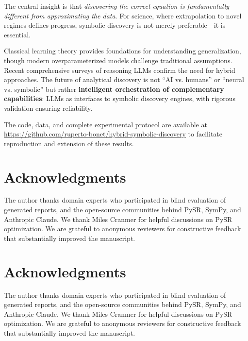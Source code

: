\documentclass[twoside,11pt]{article}
\begin{document}
The central insight is that \emph{discovering the correct equation is fundamentally different from approximating the data}. For science, where extrapolation to novel regimes defines progress, symbolic discovery is not merely preferable---it is essential\citep{koza1994genetic}.

Classical learning theory \citep{vapnik1999overview,bishop2006pattern,goodfellow2016deep} provides foundations for understanding generalization, though modern overparameterized models challenge traditional assumptions. Recent comprehensive surveys \citep{zhang2025survey} of reasoning LLMs confirm the need for hybrid approaches. The future of analytical discovery is not ``AI vs. humans'' or ``neural vs. symbolic'' but rather \textbf{intelligent orchestration of complementary capabilities}: LLMs as interfaces to symbolic discovery engines, with rigorous validation ensuring reliability.

The code, data, and complete experimental protocol are available at \url{https://github.com/ruperto-bonet/hybrid-symbolic-discovery} to facilitate reproduction and extension of these results\citep{koza1994genetic}.

\section*{Acknowledgments}

The author thanks domain experts who participated in blind evaluation of generated reports, and the open-source communities behind PySR, SymPy, and Anthropic Claude. We thank Miles Cranmer for helpful discussions on PySR optimization. We are grateful to anonymous reviewers for constructive feedback that substantially improved the manuscript.



\section*{Acknowledgments}

The author thanks domain experts who participated in blind evaluation of generated reports, and the open-source communities behind PySR, SymPy, and Anthropic Claude. We thank Miles Cranmer for helpful discussions on PySR optimization. We are grateful to anonymous reviewers for constructive feedback that substantially improved the manuscript.
\end{document}
